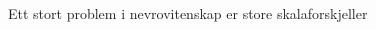 \documentclass[presentation]{beamer}
\begin{document}
\begin{frame}{Ett stort problem i nevrovitenskap er store skalaforskjeller}
\begin{columns}
\begin{column}{0.5\textwidth}
\begin{center}
         \end{center}
    \end{column}
    \end{columns}
\end{frame}
\end{document}
